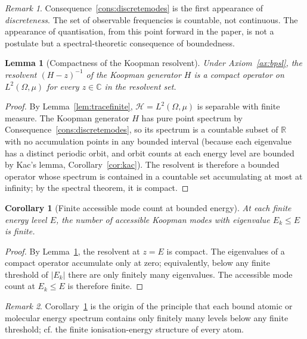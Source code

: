 \documentclass[11pt,twocolumn,a4paper]{article}
\theoremstyle{axiomstyle}
\theoremstyle{conseqstyle}
\newtheorem{lemma}{Lemma}
\newtheorem{corollary}{Corollary}
\theoremstyle{definition}
\theoremstyle{remark}
\newtheorem*{remark}{Remark}
\newcommand{\Real}{\mathbb{R}}
\newcommand{\Hilbert}{\mathcal{H}}
\begin{document}
\begin{remark}
Consequence~\ref{cons:discretemodes} is the first appearance of \emph{discreteness}. The set of observable frequencies is countable, not continuous. The appearance of quantisation, from this point forward in the paper, is not a postulate but a spectral-theoretic consequence of boundedness.
\end{remark}

\begin{lemma}[Compactness of the Koopman resolvent]
\label{lem:compactres}
Under Axiom~\ref{ax:bpsl}, the resolvent $(H-z)^{-1}$ of the Koopman generator $H$ is a compact operator on $L^{2}(\Omega,\mu)$ for every $z\in\mathbb{C}$ in the resolvent set.
\end{lemma}

\begin{proof}
By Lemma~\ref{lem:tracefinite}, $\Hilbert=L^{2}(\Omega,\mu)$ is separable with finite measure. The Koopman generator $H$ has pure point spectrum by Consequence~\ref{cons:discretemodes}, so its spectrum is a countable subset of $\Real$ with no accumulation points in any bounded interval (because each eigenvalue has a distinct periodic orbit, and orbit counts at each energy level are bounded by Kac's lemma, Corollary~\ref{cor:kac}). The resolvent is therefore a bounded operator whose spectrum is contained in a countable set accumulating at most at infinity; by the spectral theorem, it is compact.
\end{proof}

\begin{corollary}[Finite accessible mode count at bounded energy]
\label{cor:finiteenergy}
At each finite energy level $E$, the number of accessible Koopman modes with eigenvalue $E_{k}\le E$ is finite.
\end{corollary}

\begin{proof}
By Lemma~\ref{lem:compactres}, the resolvent at $z=E$ is compact. The eigenvalues of a compact operator accumulate only at zero; equivalently, below any finite threshold of $|E_{k}|$ there are only finitely many eigenvalues. The accessible mode count at $E_{k}\le E$ is therefore finite.
\end{proof}

\begin{remark}
Corollary~\ref{cor:finiteenergy} is the origin of the principle that each bound atomic or molecular energy spectrum contains only finitely many levels below any finite threshold; cf. the finite ionisation-energy structure of every atom.
\end{remark}
\end{document}
